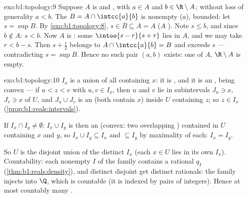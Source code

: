 \begin{solution}{exo:b1:topology:9}
Suppose $A$ is  and , with $a \in A$ and $b \in \R
\setminus A$; without loss of generality $a < b$. The  $B = A \cap
\intcc{a}{b}$ is nonempty ($a$), bounded: let $s = \sup B$. By
\cref{exo:b1:topology:8}, $s \in \overline B \subseteq \overline A =
A$ ($A$ ). Note $s \leq b$, and since $b \notin A$: $s < b$.
Now $A$ is : some  $\intoo{s - r}{s + r}$ lies in $A$,
and we may take $r < b - s$. Then $s + \frac{r}{2}$ belongs to $A
\cap \intcc{a}{b} = B$ and exceeds $s$ --- contradicting $s = \sup
B$. Hence no such pair $(a, b)$ exists: one of $A$, $\R \setminus A$
is empty.
\end{solution}

\begin{solution}{exo:b1:topology:10}
$I_x$ is a union of   all containing $x$: it is ,
and it is an , being convex --- if $u < z < v$ with $u, v \in
I_x$, then $u$ and $v$ lie in  subintervals $J_u \ni x$, $J_v \ni
x$ of $U$, and $J_u \cup J_v$ is an  (both contain $x$)
inside $U$ containing $z$; so $z \in I_x$
(\cref{prop:b1:reals:intervals}).

If $I_x \cap I_y \neq \emptyset$: $I_x \cup I_y$ is then an 
 (convex: two overlapping ) contained in $U$
containing $x$ and $y$, so $I_x \cup I_y \subseteq I_x$ and
$\subseteq I_y$ by maximality of each: $I_x = I_y$.

So $U$ is the disjoint union of the distinct  $I_x$ (each $x \in
U$ lies in its own $I_x$). Countability: each nonempty  
$I$ of the family contains a rational $q_I$
(\cref{thm:b1:reals:density}), and distinct disjoint  get
distinct rationals: the family injects into $\Q$, which is countable
(it is indexed by pairs of integers). Hence at most countably many
.
\end{solution}

